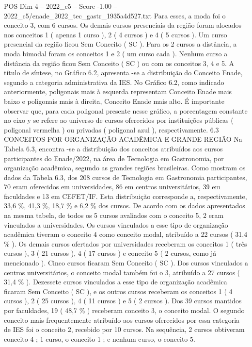 \begin{textsample}{POS Dim 4 – 2022\_c5 – Score -1.00 – 2022\_c5/enade\_2022\_tec\_gastr\_1935a4d527.txt}
Para esses, a moda foi o conceito 3, com 6 cursos.
Os demais cursos presenciais da região foram alocados nos conceitos 1 ( apenas 1 curso ), 2 ( 4 cursos ) e 4 ( 5 cursos ).
Um curso presencial da região ficou Sem Conceito ( SC ).
Para os 2 cursos a distância, a moda bimodal foram os conceitos 1 e 2 ( um curso cada ).
Nenhum curso a distância da região ficou Sem Conceito ( SC ) ou com os conceitos 3, 4 e 5.
A título de síntese, no Gráfico 6.2, apresenta -se a distribuição do Conceito Enade, segundo a categoria administrativa da IES.
No Gráfico 6.2, como indicado anteriormente, poligonais mais à esquerda representam Conceito Enade mais baixo e poligonais mais à direita, Conceito Enade mais alto.
É importante observar que, para cada poligonal presente nesse gráfico, a porcentagem constante no eixo y se refere ao universo de cursos oferecidos por instituições públicas ( poligonal vermelha ) ou privadas ( poligonal azul ), respectivamente. 6.3 CONCEITOS POR ORGANIZAÇÃO ACADÊMICA E GRANDE REGIÃO Na Tabela 6.3, encontra -se a distribuição dos conceitos atribuídos aos cursos participantes do Enade/2022, na área de Tecnologia em Gastronomia, por organização acadêmica, segundo as grandes regiões brasileiras.
Como mostram os dados da Tabela 6.3, dos 208 cursos de Tecnologia em Gastronomia participantes, 70 eram oferecidos em universidades, 86 em centros universitários, 39 em faculdades e 13 em CEFET/IF.
Esta distribuição corresponde a, respectivamente, 33,6 \%, 41,3 \%, 18,7 \% e 6,2 \% dos cursos.
De acordo com os dados apresentados na mesma tabela, de todos os 5 cursos avaliados com o conceito 5, 2 eram vinculados a universidades.
Os cursos vinculados a esse tipo de organização acadêmica tiveram o conceito 4 como conceito modal, atribuído a 22 cursos ( 31,4 \% ).
Os demais cursos ofertados por universidades receberam os conceitos 1 ( três cursos ), 3 ( 21 cursos ), 4 ( 17 cursos ) e conceito 5 ( 2 cursos, como já mencionado ).
Cinco cursos ficaram Sem Conceito ( SC ).
Dos cursos vinculados a centros universitários, o conceito modal também foi o 3, atribuído a 27 cursos ( 31,4 \% ).
Dezessete cursos vinculados a esse tipo de organização acadêmica ficaram Sem Conceito ( SC ), e os outros cursos receberam os conceitos 1 ( 4 cursos ), 2 ( 25 cursos ), 4 ( 11 cursos ) e 5 ( 2 cursos ).
Dos 39 cursos mantidos por faculdades, 19 ( 48,7 \% ) receberam conceito 3, o conceito modal.
O segundo conceito mais frequentemente atribuído aos cursos oferecidos por essa categoria de IES foi o conceito 2, recebido por 10 cursos.
Na sequência, 2 cursos obtiveram conceito 4 ; 1 curso, o conceito 1 ; e nenhum curso, o conceito 5.

\end{textsample}
